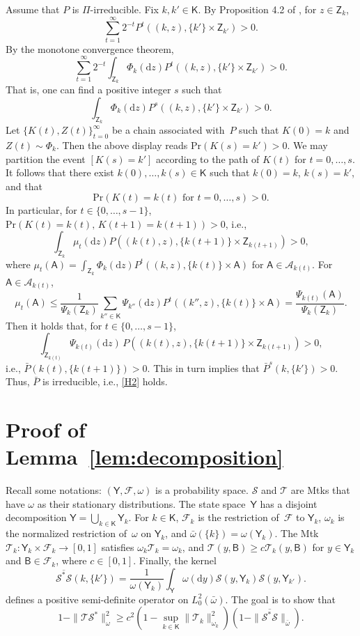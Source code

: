 \documentclass[12pt]{article}
\newcommand{\df}{\mathrm{d}}
\newcommand{\Y}{\mathsf{Y}}
\newcommand{\Z}{\mathsf{Z}}
\newcommand{\A}{\mathcal{A}}
\newcommand{\F}{\mathcal{F}}
\newcommand{\Mtk}{\mtkfont{T}}
\newcommand{\mtkfont}{\mathcal}
\begin{document}
Assume that $P$ is $\Pi$-irreducible.
Fix $k, k' \in \mathsf{K}$.
By Proposition 4.2 of \cite{meyn2012markov}, for $z \in \Z_k$,
\[
\sum_{t=1}^{\infty} 2^{-t} P^t((k,z), \{k'\} \times \Z_{k'}) > 0.
\]
By the monotone convergence theorem, 
\[
\sum_{t=1}^{\infty} 2^{-t} \int_{\Z_k} \Phi_k(\df z) P^t((k,z), \{k'\} \times \Z_{k'}) > 0.
\]
That is, one can find a positive integer $s$ such that 
\[
\int_{\Z_k} \Phi_k(\df z) P^s((k,z), \{k'\} \times \Z_{k'}) > 0.
\]
Let $\{K(t), Z(t)\}_{t=0}^{\infty}$ be a chain associated with~$P$ such that $K(0) = k$ and $Z(t) \sim \Phi_k$.
Then the above display reads $\mbox{Pr}(K(s) = k') > 0$.
We may partition the event $[K(s) = k']$ according to the path of $K(t)$ for $t = 0,\dots,s$.
It follows that there exist $k(0), \dots, k(s) \in \mathsf{K}$ such that $k(0) = k$, $k(s) = k'$, and that
\[
\mbox{Pr} \left( K(t) = k(t) \text{ for } t = 0,\dots,s \right) > 0.
\] 
In particular, for $t \in \{0,\dots,s-1\}$, $\mbox{Pr}(K(t) = k(t), \, K(t+1) = k(t+1)) > 0$, i.e.,
\[
\int_{\Z_k} \mu_t(\df z) P((k(t),z), \{k(t+1)\} \times \Z_{k(t+1)} ) > 0,
\]
where $\mu_t(\mathsf{A}) = \int_{\Z_k} \Phi_k(\df z) P^t((k,z), \{k(t)\} \times \mathsf{A})$ for $\mathsf{A} \in \A_{k(t)}$.
For $\mathsf{A} \in \A_{k(t)}$,
\[
\mu_t(\mathsf{A}) \leq \frac{1}{\Psi_k(\Z_k)} \sum_{k'' \in \mathsf{K}} \Psi_{k''}(\df z) P^t((k'',z), \{k(t)\} \times \mathsf{A}) = \frac{\Psi_{k(t)}(\mathsf{A})}{\Psi_k(\Z_k)}.
\]
Then it holds that, for $t \in \{0,\dots,s-1\}$,
\[
\int_{\Z_{k(t)}} \Psi_{k(t)}(\df z) \, P((k(t),z), \{k(t+1)\} \times \Z_{k(t+1)} ) > 0,
\]
i.e., $\bar{P}(k(t), \{k(t+1)\}) > 0$.
This in turn implies that $\bar{P}^s(k,\{k'\}) > 0$.
Thus, $\bar{P}$ is irreducible, i.e., \ref{H2} holds.


\section{Proof of Lemma~\ref{lem:decomposition}} \label{app:decomposition}

Recall some notations: 
$(\Y,\F,\omega)$ is a probability space.
$\mtkfont{S}$ and $\Mtk$ are Mtks that have $\omega$ as their stationary distributions.
The state space~$\Y$ has a disjoint decomposition $\Y = \bigcup_{k \in \mathsf{K}} \Y_k$.
For $k \in \mathsf{K}$, $\F_k$ is the restriction of~$\F$ to $\Y_k$, $\omega_k$ is the normalized restriction of~$\omega$ on $\Y_k$, and $\bar{\omega}(\{k\}) = \omega(\Y_k)$.
The Mtk $\Mtk_k: \Y_k \times \F_k \to [0,1]$ satisfies $\omega_k \Mtk_k = \omega_k$, and $\Mtk(y,\mathsf{B}) \geq c\Mtk_k(y, \mathsf{B})$ for $y \in \Y_k$ and $\mathsf{B} \in \F_k$, where $c \in [0,1]$.
Finally, the kernel
\[
\overline{\mtkfont{S}^* \mtkfont{S}}(k,\{k'\}) = \frac{1}{\omega(\Y_k)} \int_{\Y} \omega(\df y) \mtkfont{S}(y, \Y_k) \mtkfont{S}(y, \Y_{k'}).
\]
defines a positive semi-definite operator on $L_0^2(\bar{\omega})$.
The goal is to show that
\[
1 - \|\Mtk \mtkfont{S}^*\|_{\omega}^2 \geq c^2 \left(1 - \sup_{k \in \mathsf{K}} \|\Mtk_k\|_{\omega_k}^2 \right) (1 - \|\overline{\mtkfont{S}^* \mtkfont{S}}\|_{\bar{\omega}} ).
\]
\end{document}

